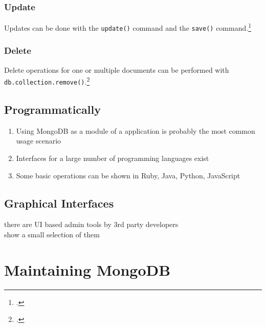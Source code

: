 \subsubsection{Update}
Updates can be done with the \texttt{update()} command and the \texttt{save()}
command.\footcite[Cf.][p. 75 et. sqq.]{mongo_crud_manual}



\subsubsection{Delete}
Delete operations for one or multiple documents can be performed with
\texttt{db.collection.remove()}.\footcite[Cf.][p. 83 et.
sqq.]{mongo_crud_manual}


\subsection{Programmatically}
\label{sec:usage-programmatically}
\begin{enumerate}
  \item Using MongoDB as a module of a application is probably the most common usage scenario
  \item Interfaces for a large number of programming languages exist
  \item Some basic operations can be shown in Ruby, Java, Python, JavaScript
\end{enumerate}


\subsection{Graphical Interfaces}
\label{sec:usage-gui}
there are UI based admin tools by 3rd party developers\\
show a small selection of them

\newpage
\section{Maintaining MongoDB}
\label{sec:maintenance}

